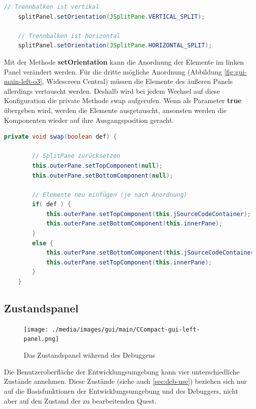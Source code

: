 \begin{lstlisting}[language=JAVA]
	// Trennbalken ist vertikal
	splitPanel.setOrientation(JSplitPane.VERTICAL_SPLIT);
	
	// Trennbalken ist horizontal
	splitPanel.setOrientation(JSplitPane.HORIZONTAL_SPLIT);
\end{lstlisting}

Mit der Methode \textbf{setOrientation} kann die Anordnung der Elemente im linken Panel verändert werden. Für die dritte mögliche Anordnung (Abbildung \ref{fig:gui-main-left-o3}, \glqq{}Widescreen Central\grqq{}) müssen die Elemente des äußeren Panels allerdings vertauscht werden. Deshalb wird bei jedem Wechsel auf diese Konfiguration die private Methode \glqq{}swap\grqq{} aufgerufen. Wenn als Parameter \textbf{true} übergeben wird, werden die Elemente ausgetauscht, ansonsten werden die Komponenten wieder auf ihre Ausgangsposition geracht.

\begin{lstlisting}[language=JAVA]
	private void swap(boolean def) {
		
		// SplitPane zurücksetzen
		this.outerPane.setTopComponent(null);
		this.outerPane.setBottomComponent(null);
		
		// Elemente neu einfügen (je nach Anordnung)
		if( def ) {
			this.outerPane.setTopComponent(this.jSourceCodeContainer);
			this.outerPane.setBottomComponent(this.innerPane);
		}
		else {
			this.outerPane.setBottomComponent(this.jSourceCodeContainer);
			this.outerPane.setTopComponent(this.innerPane);
		}
	}
\end{lstlisting}

\subsection{Zustandspanel}
\label{sec:gui-main-left-zust}

\begin{figure}[htbp] 
  \centering
     \texttt{[image: ./media/images/gui/main/CCompact-gui-left-panel.png]}
  \caption{Das Zustandspanel während des Debuggens}
  \label{fig:gui-main-left-panel}
\end{figure}

Die Benutzeroberfläche der Entwicklungsumgebung kann vier unterschiedliche Zustände annehmen. Diese Zustände (siehe auch \ref{sec:deb-use}) beziehen sich nur auf die Basisfunktionen der Entwicklungsumgebung und des Debuggers, nicht aber auf den Zustand der zu bearbeitenden Quest.

